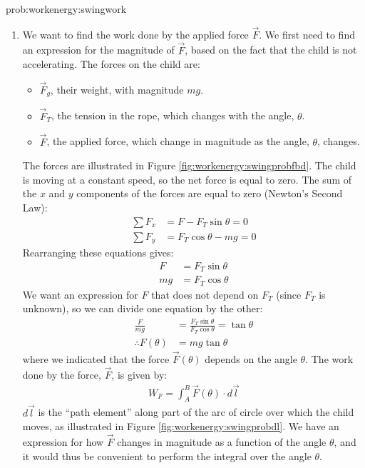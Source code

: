 \begin{solution}{prob:workenergy:swingwork}\label{soln:workenergy:swingwork}
\begin{enumerate}[label=\alph*)]
\item We want to find the work done by the applied force $\vec F$. We first need to find an expression for the magnitude of $\vec F$, based on the fact that the child is not accelerating. The forces on the child are:
\begin{itemize}
\item $\vec F_g$, their weight, with magnitude $mg$.
\item $\vec F_T$, the tension in the rope, which changes with the angle, $\theta$.
\item $\vec F$, the applied force, which change in magnitude as the angle, $\theta$, changes.
\end{itemize}
The forces are illustrated in Figure \ref{fig:workenergy:swingprobfbd}. 
The child is moving at a constant speed, so the net force is equal to zero. The sum of the $x$ and $y$ components of the forces are equal to zero (Newton's Second Law):
\begin{align*}
\sum F_x &= F-F_T\sin\theta =0\\
\sum F_y &= F_T\cos\theta -mg = 0
\end{align*} 
Rearranging these equations gives:
\begin{align*}
F&=F_T\sin\theta\\
mg&=F_T\cos\theta
\end{align*}
We want an expression for $F$ that does not depend on $F_T$ (since $F_T$ is unknown), so we can divide one equation by the other:
\begin{align*}
\frac{F}{mg} &= \frac{F_T\sin\theta}{F_T\cos\theta}=\tan\theta\\
\therefore F(\theta)&=mg\tan\theta
\end{align*}
where we indicated that the force $\vec F(\theta)$ depends on the angle $\theta$. The work done by the force, $\vec F$, is given by:
\begin{align*}
W_F=\int_A^B\vec F(\theta) \cdot d\vec l
\end{align*} 
$d\vec l$ is the ``path element'' along part of the arc of circle over which the child moves, as illustrated in Figure \ref{fig:workenergy:swingprobdl}. We have an expression for how $\vec F$ changes in magnitude as a function of the angle $\theta$, and it would thus be convenient to perform the integral over the angle $\theta$.

\end{enumerate}
\end{solution}
